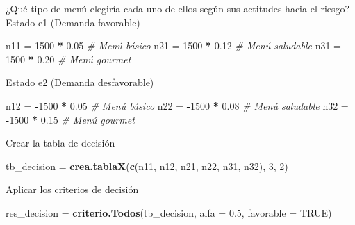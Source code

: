 \documentclass[
]{article}
\newenvironment{Shaded}{\begin{snugshade}}{\end{snugshade}}
\newcommand{\AttributeTok}[1]{\textcolor[rgb]{0.13,0.29,0.53}{#1}}
\newcommand{\CommentTok}[1]{\textcolor[rgb]{0.56,0.35,0.01}{\textit{#1}}}
\newcommand{\ConstantTok}[1]{\textcolor[rgb]{0.56,0.35,0.01}{#1}}
\newcommand{\DecValTok}[1]{\textcolor[rgb]{0.00,0.00,0.81}{#1}}
\newcommand{\FloatTok}[1]{\textcolor[rgb]{0.00,0.00,0.81}{#1}}
\newcommand{\FunctionTok}[1]{\textcolor[rgb]{0.13,0.29,0.53}{\textbf{#1}}}
\newcommand{\NormalTok}[1]{#1}
\newcommand{\OtherTok}[1]{\textcolor[rgb]{0.56,0.35,0.01}{#1}}
\newcommand{\SpecialCharTok}[1]{\textcolor[rgb]{0.81,0.36,0.00}{\textbf{#1}}}
\begin{document}
¿Qué tipo de menú elegiría cada uno de ellos según sus actitudes hacia
el riesgo? Estado e1 (Demanda favorable)

\begin{Shaded}
\begin{Highlighting}[]
\NormalTok{n11 }\OtherTok{=} \DecValTok{1500} \SpecialCharTok{*} \FloatTok{0.05}     \CommentTok{\# Menú básico}
\NormalTok{n21 }\OtherTok{=} \DecValTok{1500} \SpecialCharTok{*} \FloatTok{0.12}     \CommentTok{\# Menú saludable}
\NormalTok{n31 }\OtherTok{=} \DecValTok{1500} \SpecialCharTok{*} \FloatTok{0.20}     \CommentTok{\# Menú gourmet}
\end{Highlighting}
\end{Shaded}

Estado e2 (Demanda desfavorable)

\begin{Shaded}
\begin{Highlighting}[]
\NormalTok{n12 }\OtherTok{=} \SpecialCharTok{{-}}\DecValTok{1500} \SpecialCharTok{*} \FloatTok{0.05}    \CommentTok{\# Menú básico}
\NormalTok{n22 }\OtherTok{=} \SpecialCharTok{{-}}\DecValTok{1500} \SpecialCharTok{*} \FloatTok{0.08}    \CommentTok{\# Menú saludable}
\NormalTok{n32 }\OtherTok{=} \SpecialCharTok{{-}}\DecValTok{1500} \SpecialCharTok{*} \FloatTok{0.15}    \CommentTok{\# Menú gourmet}
\end{Highlighting}
\end{Shaded}

Crear la tabla de decisión

\begin{Shaded}
\begin{Highlighting}[]
\NormalTok{tb\_decision }\OtherTok{=} \FunctionTok{crea.tablaX}\NormalTok{(}\FunctionTok{c}\NormalTok{(n11, n12,}
\NormalTok{                            n21, n22,}
\NormalTok{                            n31, n32), }\DecValTok{3}\NormalTok{, }\DecValTok{2}\NormalTok{)}
\end{Highlighting}
\end{Shaded}

Aplicar los criterios de decisión

\begin{Shaded}
\begin{Highlighting}[]
\NormalTok{res\_decision }\OtherTok{=} \FunctionTok{criterio.Todos}\NormalTok{(tb\_decision, }\AttributeTok{alfa =} \FloatTok{0.5}\NormalTok{, }\AttributeTok{favorable =} \ConstantTok{TRUE}\NormalTok{)}
\end{Highlighting}
\end{Shaded}
\end{document}
